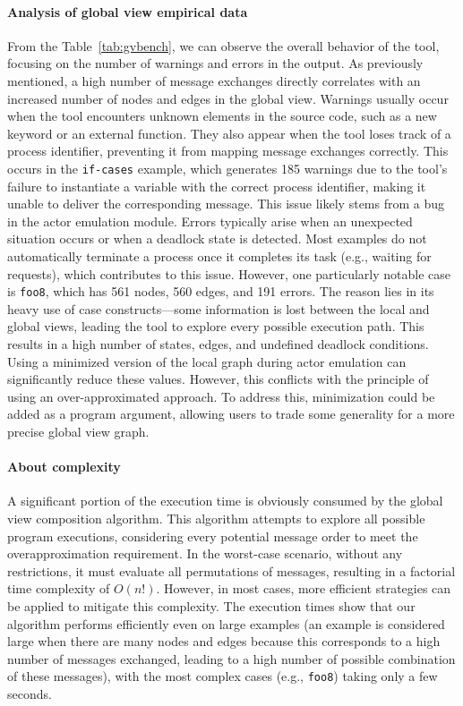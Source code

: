 \paragraph{Analysis of global view empirical data}
From the Table~\ref{tab:gvbench}, we can observe the overall behavior of the tool, 
focusing on the number of warnings and errors in the output. 
As previously mentioned, a high number of message exchanges directly correlates  
with an increased number of nodes and edges in the global view.
Warnings usually occur when the
tool encounters unknown elements in the source code, such as a new keyword or
an external function. They also appear when the tool loses track of a process
identifier, preventing it from mapping message exchanges correctly. 
This occurs in the \texttt{if-cases} example, which generates 185 warnings due to
the tool's failure to instantiate a variable with the correct process identifier,
making it unable to deliver the corresponding message. This issue likely stems 
from a bug in the actor emulation module.
Errors typically arise when an unexpected situation occurs or when a deadlock
state is detected. Most examples do not automatically terminate a process once
it completes its task (e.g., waiting for requests), which contributes to this
issue. However, one particularly notable case is \texttt{foo8}, which has 561
nodes, 560 edges, and 191 errors. The reason lies in its heavy use of case
constructs—some information is lost between the local and global views, leading
the tool to explore every possible execution path. This results in a high number
of states, edges, and undefined deadlock conditions. 
Using a minimized version of the local graph during actor emulation can
significantly reduce these values. However, this conflicts with the principle
of using an over-approximated approach. To address this, minimization could be
added as a program argument, allowing users to trade some generality for a
more precise global view graph.

\paragraph{About complexity}
A significant portion of the execution time is obviously consumed by the global  
view composition algorithm. This algorithm attempts to explore all possible  
program executions, considering every potential message order to meet the  
overapproximation requirement. In the worst-case scenario, without any  
restrictions, it must evaluate all permutations of messages, resulting in a  
factorial time complexity of \( O(n!) \). However, in most cases, more efficient  
strategies can be applied to mitigate this complexity.
The execution times show that our algorithm performs efficiently even on large 
examples (an example is considered large when there are many nodes and edges
because this corresponds to a high number of messages exchanged, leading to a
high number of possible combination of these messages), with the most complex 
cases (e.g., \texttt{foo8}) taking only a few seconds.

